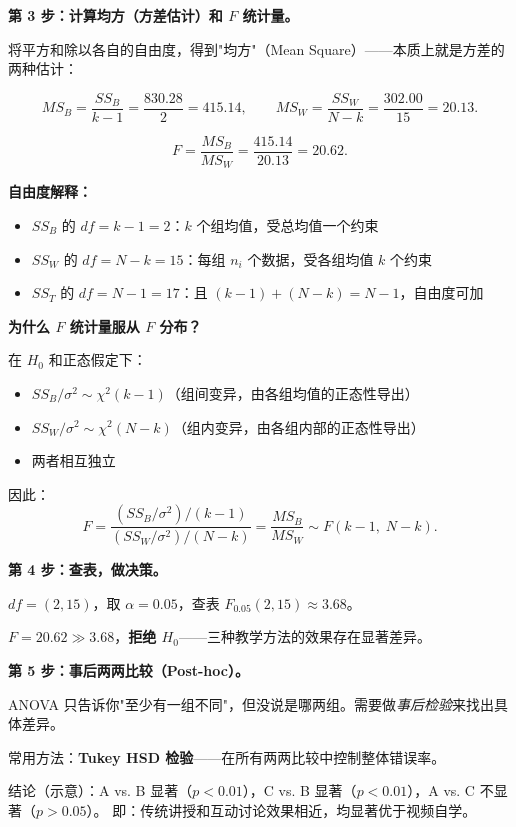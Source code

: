 \textbf{第 3 步：计算均方（方差估计）和 $F$ 统计量。}

将平方和除以各自的自由度，得到"均方"（Mean Square）——本质上就是方差的两种估计：

\begin{equation}
    MS_B = \frac{SS_B}{k-1} = \frac{830.28}{2} = 415.14, \qquad
    MS_W = \frac{SS_W}{N-k} = \frac{302.00}{15} = 20.13.
\end{equation}

\[
\boxed{F = \frac{MS_B}{MS_W} = \frac{415.14}{20.13} = 20.62}.
\]

\textbf{自由度解释：}
\begin{itemize}
    \item $SS_B$ 的 $df = k-1 = 2$：$k$ 个组均值，受总均值一个约束
    \item $SS_W$ 的 $df = N-k = 15$：每组 $n_i$ 个数据，受各组均值 $k$ 个约束
    \item $SS_T$ 的 $df = N-1 = 17$：且 $(k-1) + (N-k) = N-1$，自由度可加
\end{itemize}

\textbf{为什么 $F$ 统计量服从 $F$ 分布？}

在 $H_0$ 和正态假定下：
\begin{itemize}
    \item $SS_B / \sigma^2 \sim \chi^2(k-1)$（组间变异，由各组均值的正态性导出）
    \item $SS_W / \sigma^2 \sim \chi^2(N-k)$（组内变异，由各组内部的正态性导出）
    \item 两者相互独立
\end{itemize}

因此：
\begin{equation}
    F = \frac{(SS_B/\sigma^2) / (k-1)}{(SS_W/\sigma^2) / (N-k)}
      = \frac{MS_B}{MS_W} \sim F(k-1,\; N-k).
\end{equation}

\textbf{第 4 步：查表，做决策。}

$df = (2, 15)$，取 $\alpha = 0.05$，查表 $F_{0.05}(2, 15) \approx 3.68$。

$F = 20.62 \gg 3.68$，\textbf{拒绝 $H_0$}——三种教学方法的效果存在显著差异。

\medskip
\textbf{第 5 步：事后两两比较（Post-hoc）。}

ANOVA 只告诉你"至少有一组不同"，但没说是哪两组。需要做\emph{事后检验}来找出具体差异。

常用方法：\textbf{Tukey HSD 检验}——在所有两两比较中控制整体错误率。

结论（示意）：A vs. B 显著（$p < 0.01$），C vs. B 显著（$p < 0.01$），A vs. C 不显著（$p > 0.05$）。
即：传统讲授和互动讨论效果相近，均显著优于视频自学。

